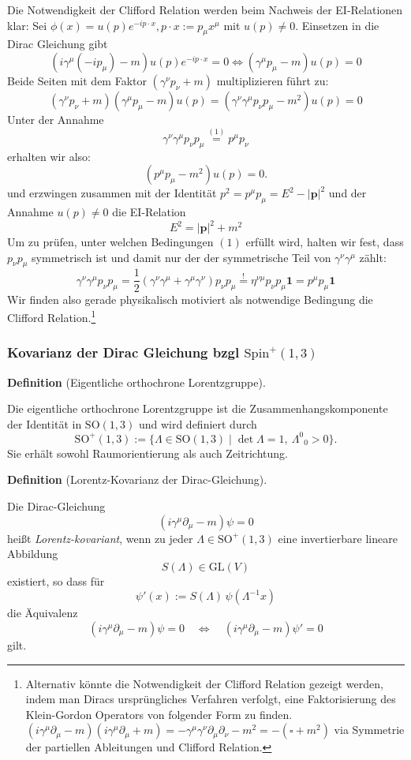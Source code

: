 \documentclass[10pt, letterpaper]{article}
\newcommand{\GL}{\mathrm{GL}}
\newcommand{\SO}{\mathrm{SO}}
\newcommand{\Spin}{\mathrm{Spin}}
\newcommand{\CustomHeading}[3]{%
  \par\medskip\noindent%
  \textbf{#1 #2} \textnormal{(#3)}.\enskip%
}
\newenvironment{DEF}[2]{\CustomHeading{Definition}{#1}{#2}}{}
\begin{document}
Die Notwendigkeit der Clifford Relation werden beim Nachweis der EI-Relationen klar: Sei $\phi(x)=u(p)e^{-ip\cdot x}, p \cdot x:=p_\mu x^\mu$ mit $u(p)\neq 0$. Einsetzen in die Dirac Gleichung gibt
$$\left(i \gamma^\mu\left(-i p_\mu\right)-m\right) u(p) e^{-i p \cdot x}=0 \Longleftrightarrow\left(\gamma^\mu p_\mu-m\right) u(p)=0$$
Beide Seiten mit dem Faktor $\left(\gamma^\nu p_\nu+m\right)$ multiplizieren führt zu:
$$\left(\gamma^\nu p_\nu+m\right)\left(\gamma^\mu p_\mu-m\right) u(p)= (\gamma^\nu \gamma^\mu p_\nu p_\mu-m^2)u(p)=0$$
Unter der Annahme
$$\gamma^\nu \gamma^\mu p_\nu p_\mu \overset{(1)}{=} p^\mu p_\nu$$
erhalten wir also:
$$
\left(p^\mu p_\mu-m^2\right) u(p)=0 .
$$
und erzwingen zusammen mit der Identität $p^2=p^\mu p_\mu=E^2-|\mathbf{p}|^2$ und der Annahme $u(p)\neq 0$ die EI-Relation
$$E^2=|\mathbf{p}|^2+m^2$$
Um zu prüfen, unter welchen Bedingungen $(1)$ erfüllt wird, halten wir fest, dass $p_\nu p_\mu$ symmetrisch ist und damit nur der der symmetrische Teil von $\gamma^\nu \gamma^\mu$ zählt:
$$
\gamma^\nu \gamma^\mu p_\nu p_\mu=\frac{1}{2}\left(\gamma^\nu \gamma^\mu+\gamma^\mu \gamma^\nu\right) p_\nu p_\mu\overset{!}{=}\eta^{\nu \mu} p_\nu p_\mu \mathbf{1}=p^\mu p_\mu \mathbf{1}
$$
Wir finden also gerade physikalisch motiviert als notwendige Bedingung die Clifford Relation.\footnote{Alternativ könnte die Notwendigkeit der Clifford Relation gezeigt werden, indem man Diracs ursprüngliches Verfahren verfolgt, eine Faktorisierung des Klein-Gordon Operators von folgender Form zu finden. $(i\gamma^\mu\partial_\mu -m)(i\gamma^\mu\partial_\mu +m)=-\gamma^\mu\gamma^\nu\partial_\mu\partial_\nu -m^2=-(\square +m^2)$ via Symmetrie der partiellen Ableitungen und Clifford Relation.}


\subsubsection{Kovarianz der Dirac Gleichung bzgl $\Spin^+(1,3)$}

\begin{DEF}{}{Eigentliche orthochrone Lorentzgruppe}
Die eigentliche orthochrone Lorentzgruppe ist die Zusammenhangskomponente
der Identität in $\SO(1,3)$ und wird definiert durch
\[
\SO^{+}(1,3)
:=\{\Lambda\in\SO(1,3)\mid \det\Lambda=1,\ \Lambda^0{}_0>0\}.
\]
Sie erhält sowohl Raumorientierung als auch Zeitrichtung.
\end{DEF}

\begin{DEF}{}{Lorentz-Kovarianz der Dirac-Gleichung}
Die Dirac-Gleichung
\[
(i\gamma^\mu\partial_\mu - m)\psi = 0
\]
heißt \emph{Lorentz-kovariant}, wenn zu jeder
$\Lambda\in\SO^{+}(1,3)$ eine invertierbare lineare Abbildung
\[
S(\Lambda)\in\GL(V)
\]
existiert, so dass für
\[
\psi'(x):=S(\Lambda)\,\psi(\Lambda^{-1}x)
\]
die Äquivalenz
\[
(i\gamma^\mu\partial_\mu - m)\psi = 0
\quad\Longleftrightarrow\quad
(i\gamma^\mu\partial_\mu - m)\psi' = 0
\]
gilt.
\end{DEF}
\end{document}

